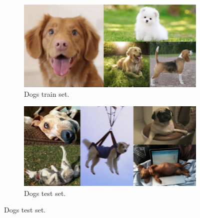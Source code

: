 



\begin{figure}
     \centering
     \begin{subfigure}[b]{0.49\textwidth}
         \centering
         \includegraphics[width=\textwidth]{figures/intro/dogs_train.png}
         \caption{Dogs train set.}
     \end{subfigure}
     \hfill
     \begin{subfigure}[b]{0.49\textwidth}
         \centering
         \includegraphics[width=\textwidth]{figures/intro/dogs_test.png}
         \caption{Dogs test set.}
     \end{subfigure}


\end{figure}
